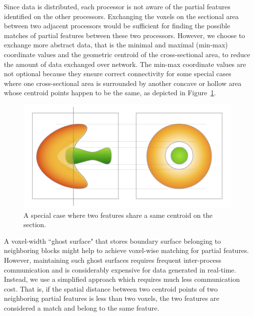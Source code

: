 \documentclass[10pt, conference, compsocconf]{IEEEtran}
\begin{document}
Since data is distributed, each processor is not aware of the partial features identified on the other processors. Exchanging the voxels on the sectional area between two adjacent processors would be sufficient for finding the possible matches of partial features between these two processors. However, we choose to exchange more abstract data, that is the minimal and maximal (min-max) coordinate values and the geometric centroid of the cross-sectional area, to reduce the amount of data exchanged over network. The min-max coordinate values are not optional because they ensure correct connectivity for some special cases where one cross-sectional area is surrounded by another concave or hollow area whose centroid points happen to be the same, as depicted in Figure~\ref{fig:special}.

\begin{figure}[ht]
\centering
\includegraphics[width=0.9\linewidth]{figure1@2x.png}
\caption{A special case where two features share a same centroid on the section.}
\label{fig:special}
\end{figure}

A voxel-width ``ghost surface" that stores boundary surface belonging to neighboring blocks might help to achieve voxel-wise matching for partial features. However, 
maintaining such ghost surfaces requires frequent inter-process communication and is considerably expensive for data generated in real-time. 
Instead, we use a simplified approach which requires much less communication cost. That is, if the spatial distance between two centroid points of two neighboring partial features is less than two voxels, the two features are considered a match and belong to the same feature.
\end{document}
